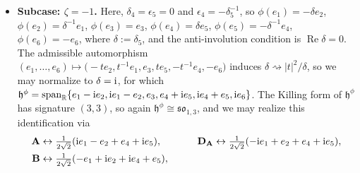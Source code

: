 \documentclass[pdftex]{sigma}
\newlength{\caseIndent}
\DeclareMathOperator{\spanOperator}{span}
\renewcommand{\Re}{\operatorname{Re}}
\newcommand{\Span}[1]{\spanOperator\{{#1}\}}
\newcommand{\bbR}{\mathbb{R}}
\newcommand{\mbA}{\mathbf{A}}
\newcommand{\mbB}{\mathbf{B}}
\newcommand{\mbC}{\mathbf{C}}
\newcommand{\mbD}{\mathbf{D}}
\newcommand{\mfd} {\mathfrak{d}}
\newcommand{\mfh} {\mathfrak{h}}
\newcommand{\mfk} {\mathfrak{k}}
\newcommand{\mfso} {\mathfrak{so}}
\numberwithin{equation}{section}
\begin{document}
\begin{itemize}[leftmargin=\caseIndent]
 If we fix a basis $(\mbA, \mbB, \mbC, \mbD_{\mbA}, \mbD_{\mbB}, \mbD_{\mbC})$ of $\mfso_{1, 3}$ satisfying the identities $[\mbA, \mbB] = \mbC$, $[\mbA, \mbD_{\mbB}] = -[\mbB, \mbD_{\mbA}] = \mbD_{\mbC}$, and $[\mbD_{\mbA}, \mbD_{\mbB}] = \mbC$ and their cyclic permutations, as well as $[\mbA, \mbD_{\mbA}] = [\mbB, \mbD_{\mbB}] = [\mbC, \mbD_{\mbC}] = 0$, then we may realize this identification explicitly via
		\begin{alignat*}{4}
			 \mbA &\leftrightarrow \tfrac{1}{2} (- e_2 + e_4) , \qquad
			&\mbD_{\mbA} &\leftrightarrow \tfrac{1}{2} {\rm i} (- e_1 + e_5) , \\
			 \mbB &\leftrightarrow \tfrac{1}{2} {\rm i} ( e_1 + e_5) , \qquad
			&\mbD_{\mbB} &\leftrightarrow \tfrac{1}{2} ( e_2 + e_4) , \\
			 \mbC &\leftrightarrow \tfrac{1}{2} {\rm i} e_3 , \qquad
			&\mbD_{\mbC} &\leftrightarrow \tfrac{1}{2} e_6 .
		\end{alignat*}
		Then, the model, which we denote $\mathbf{D.6}_{-1}^{3-}$, is
		\begin{gather*}
			\boxed{
 \mfh^{\phi} \cong \mfso_{1, 3} , \qquad
 \mfk^{\phi} = \Span{\mbD_{\mbC}} , \qquad
				\mfd^{\phi} = \Span{\mbA + \mbD_{\mbB}, \mbB + \mbD_{\mbA}} \oplus \mfk^{\phi} .
			}
		\end{gather*}
	\item[] \textbf{Subcase: $\zeta = -1$.} Here, $\delta_4 = \epsilon_5 = 0$ and $\epsilon_4 = -\delta_5^{-1}$, so $\phi(e_1) = -\delta e_2$, $\phi(e_2) = \delta^{-1} e_1$, $\phi(e_3) = e_3$, $\phi(e_4) = \delta e_5$, $\phi(e_5) = -\delta^{-1} e_4$, $\phi(e_6) = -e_6$, where $\delta := \delta_5$, and the anti-involution condition is $\Re \delta = 0$. The admissible automorphism $(e_1, \ldots, e_6) \mapsto \big({-}t e_2, t^{-1} e_1, e_3, t e_5, -t^{-1} e_4, -e_6\big)$ induces $\delta \rightsquigarrow |t|^2 / \delta$, so we may normalize to $\delta = {\rm i}$, for which $\mfh^{\phi} = \spanOperator_{\bbR}\{e_1 - {\rm i} e_2, {\rm i} e_1 - e_2, e_3, e_4 + {\rm i} e_5, {\rm i} e_4 + e_5, {\rm i} e_6\}$. The Killing form of $\mfh^{\phi}$ has signature $(3, 3)$, so again $\mfh^{\phi} \cong \mfso_{1, 3}$, and we may realize this identification via
		\begin{alignat*}{4}
			 \mbA &\leftrightarrow \tfrac{1}{2 \sqrt{2}} ({\rm i} e_1 - e_2 + e_4 + {\rm i} e_5) , \qquad
			&\mbD_{\mbA} &\leftrightarrow \tfrac{1}{2 \sqrt{2}} (-{\rm i} e_1 + e_2 + e_4 + {\rm i} e_5) , \\
			 \mbB &\leftrightarrow \tfrac{1}{2 \sqrt{2}} (- e_1 + {\rm i} e_2 + {\rm i} e_4 + e_5) , \qquad

\end{alignat*}
\end{itemize}
\end{document}
